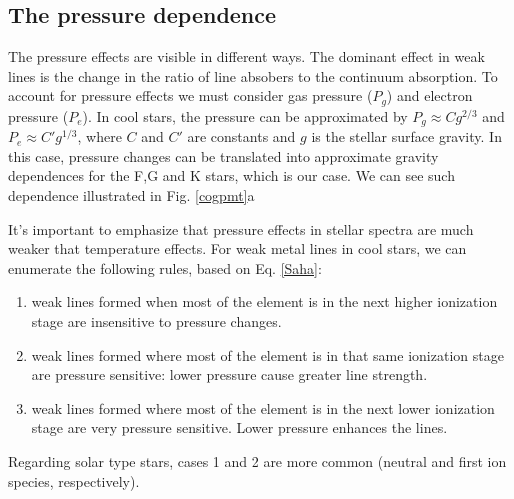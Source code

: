 \documentclass[dvips,12pt,a4paper]{report}
\begin{document}
{\subsection{The pressure dependence}

The pressure effects are visible in different ways. The dominant effect in weak lines is the change in the ratio of line absobers to the continuum absorption. To account for pressure effects we must consider gas pressure ($P_g$) and electron pressure ($P_e$). In cool stars, the pressure can be approximated by $P_g\approx C g^{2/3}$ and $P_e\approx C' g^{1/3}$, where $C$ and $C'$ are constants and $g$ is the stellar surface gravity. In this case, pressure changes can be translated into approximate gravity dependences for the F,G and K stars, which is our case. We can see such dependence illustrated in Fig. \ref{cogpmt}a 

It's important to emphasize that pressure effects in stellar spectra are much weaker that temperature effects. For weak metal lines in cool stars, we can enumerate the following rules, based on Eq. \ref{Saha}:

\begin{enumerate}
 \item weak lines formed when most of the element is in the next higher ionization stage are insensitive to pressure changes.
\item weak lines formed where most of the element is in that same ionization stage are pressure sensitive: lower pressure cause greater line strength.
\item weak lines formed where most of the element is in the next lower ionization stage are very pressure sensitive. Lower pressure enhances the lines.
\end{enumerate}

Regarding solar type stars, cases 1 and 2 are more common (neutral and first ion species, respectively).

}
\end{document}
